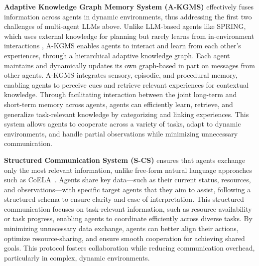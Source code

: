\textbf{Adaptive Knowledge Graph Memory System (A-KGMS)} effectively fuses information across agents in dynamic environments, thus addressing the first two challenges of multi-agent LLMs above. Unlike LLM-based agents like SPRING, which uses external knowledge for planning but rarely learns from in-environment interactions \cite{wu2024spring}, A-KGMS enables agents to interact and learn from each other's experiences, through a hierarchical adaptive knowledge graph. Each agent maintains and dynamically updates its own graph-based in part on messages from other agents.
A-KGMS integrates sensory, episodic, and procedural memory, enabling agents to perceive cues and retrieve relevant experiences for contextual knowledge. Through facilitating interaction between the joint long-term and short-term memory across agents, agents can efficiently learn, retrieve, and generalize task-relevant knowledge by categorizing and linking experiences. This system allows agents to cooperate across a variety of tasks, adapt to dynamic environments, and handle partial observations while minimizing unnecessary communication. 

\textbf{Structured Communication System (S-CS)} ensures that agents exchange only the most relevant information, unlike free-form natural language approaches such as CoELA~\cite{zhang2023building}. Agents share key data—such as their current status, resources, and observations—with specific target agents that they aim to assist, following a structured schema to ensure clarity and ease of interpretation. This structured communication focuses on task-relevant information, such as resource availability or task progress, enabling agents to coordinate efficiently across diverse tasks. By minimizing unnecessary data exchange, agents can better align their actions, optimize resource-sharing, and ensure smooth cooperation for achieving shared goals. This protocol fosters collaboration while reducing communication overhead, particularly in complex, dynamic environments.











